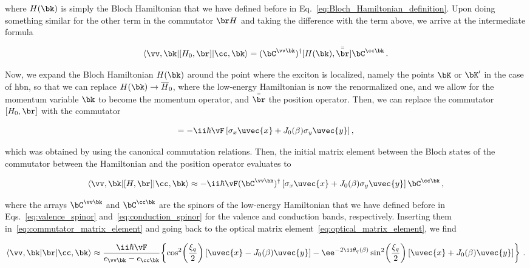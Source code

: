 \noindent where $H(\bk)$ is simply the Bloch Hamiltonian that we have defined before in Eq.~\eqref{eq:Bloch_Hamiltonian_definition}.
Upon doing something similar for the other term in the commutator $\br H$ and taking the difference with the term above, we arrive at the intermediate formula

\begin{equation}
    \langle \vv ,\bk|[H_0,\br]|\cc, \bk\rangle = (\bC^{\vv \bk})^\dagger [H(\bk),\bar{\bar{\br}}] \bC^{\cc \bk}\,.
\end{equation}

Now, we expand the Bloch Hamiltonian $H(\bk)$ around the point where the exciton is localized, namely the points $\bK$ or $\bK'$ in the case of \gls{hbn}, so that we can replace $H(\bk) \to \overline{H}_0$, where the low-energy Hamiltonian is now the renormalized one, and  we allow for the momentum variable $\bk$ to become the momentum operator, and $\bar{\bar{\br}}$ the position operator.
Then, we can replace the commutator $[H_0,\br]$ with the commutator

\begin{equation}
    [\overline{H}_0,\br] = -\ii \hbar  \vF  \left[ \sigma_{x}\uvec{x}+J_{0}(\beta)\sigma_{y}\uvec{y} \right] ,
\end{equation}

\noindent which was obtained by using the canonical commutation relations.
Then, the initial matrix element between the Bloch states of the commutator between the Hamiltonian and the position operator evaluates to

\begin{equation}
    \label{eq:commutator_matrix_element}
    \langle \vv ,\bk|[H,\br]|\cc, \bk\rangle  \approx -\ii \hbar  \vF  (\bC^{\vv \bk})^\dagger \left[ \sigma_{x}\uvec{x}+J_{0}(\beta)\sigma_{y}\uvec{y} \right] \bC^{\cc \bk}\,,
\end{equation}

\noindent where the arrays $\bC^{\vv \bk}$ and $\bC^{\cc \bk}$ are the spinors of the low-energy Hamiltonian that we have defined before in Eqs.~\eqref{eq:valence_spinor} and~\eqref{eq:conduction_spinor} for the valence and conduction bands, respectively.
Inserting them in~\eqref{eq:commutator_matrix_element} and going back to the optical matrix element~\eqref{eq:optical_matrix_element}, we find

\begin{equation}
    \label{eq:optical_matrix_element_final}
    \langle \vv ,\bk|\br|\cc, \bk\rangle \approx \frac{\ii\hbar  \vF}{\epsilon_{\vv \bk}-\epsilon_{\cc \bk}}\!\left\{\cos^{2}\!\left(\frac{\xi_{q}}{2}\right)\left[\uvec{x}-J_{0}(\beta)\uvec{y}\right]-\ee^{-2 \ii \theta_{q}(\beta)}\sin^{2}\!\left(\frac{\xi_{q}}{2}\right)\left[\uvec{x}+J_{0}(\beta)\uvec{y}\right]\right\}\,.
\end{equation}

